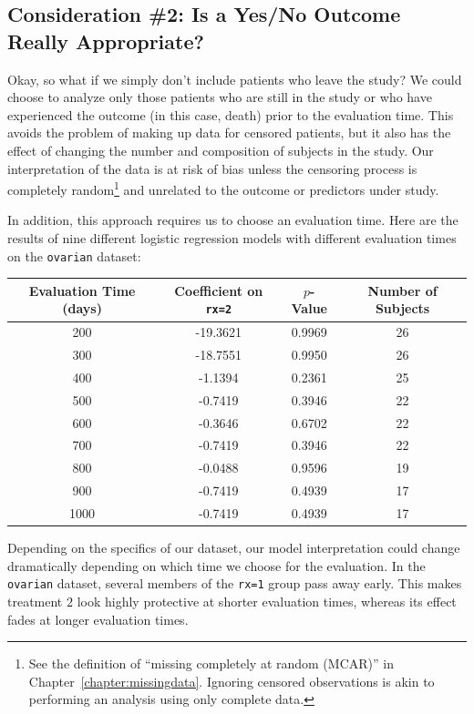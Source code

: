 \subsection{Consideration \#2: Is a Yes/No Outcome Really Appropriate?}

Okay, so what if we simply don't include patients who leave the study? We could choose to analyze only those patients who are still in the study or who have experienced the outcome (in this case, death) prior to the evaluation time. This avoids the problem of making up data for censored patients, but it also has the effect of changing the number and composition of subjects in the study. Our interpretation of the data is at risk of bias unless the censoring process is completely random\footnote{See the definition of ``missing completely at random (MCAR)'' in Chapter~\ref{chapter:missingdata}. Ignoring censored observations is akin to performing an analysis using only complete data.} and unrelated to the outcome or predictors under study.

In addition, this approach requires us to choose an evaluation time. Here are the results of nine different logistic regression models with different evaluation times on the \texttt{ovarian} dataset:
\begin{center}
{\small
\begin{tabular}{cccc}
  \toprule
  Evaluation Time (days) & Coefficient on \texttt{rx=2} & $p$-Value & Number of Subjects \\ 
  \midrule
  200 & -19.3621 & 0.9969 & 26 \\ 
  300 & -18.7551 & 0.9950 & 26 \\ 
  400 & -1.1394 & 0.2361 & 25 \\ 
  500 & -0.7419 & 0.3946 & 22 \\ 
  600 & -0.3646 & 0.6702 & 22 \\ 
  700 & -0.7419 & 0.3946 & 22 \\ 
  800 & -0.0488 & 0.9596 & 19 \\ 
  900 & -0.7419 & 0.4939 & 17 \\ 
  1000 & -0.7419 & 0.4939 & 17 \\ 
  \bottomrule
\end{tabular}
}
\end{center}
Depending on the specifics of our dataset, our model interpretation could change dramatically depending on which time we choose for the evaluation. In the \texttt{ovarian} dataset, several members of the \texttt{rx=1} group pass away early. This makes treatment $2$ look highly protective at shorter evaluation times, whereas its effect fades at longer evaluation times.

